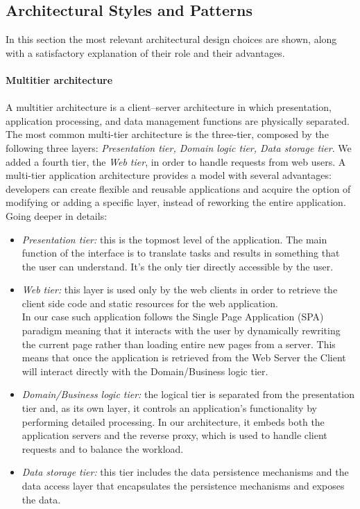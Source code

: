 \subsection{Architectural Styles and Patterns}
In this section the most relevant architectural design choices are shown, along with a satisfactory explanation of their role and their advantages. \\ \\
\noindent
\textbf{Multitier architecture}\\ \\
A multitier architecture is a client–server architecture in which presentation, application processing, and data management functions are physically separated. The most common multi-tier architecture is the three-tier, composed by the following three layers: \textit{Presentation tier, Domain logic tier, Data storage tier}. We added a fourth tier, the \textit{Web tier}, in order to handle requests from web users.
A multi-tier application architecture provides a model with several advantages: developers can create flexible and reusable applications and acquire the option of modifying or adding a specific layer, instead of reworking the entire application. Going deeper in details:
\begin{itemize}
	\item \textit{Presentation tier:} this is the topmost level of the application. The main function of the interface is to translate tasks and results in something that the user can understand. It's the only tier directly accessible by the user.
	\item \textit{Web tier:} this layer is used only by the web clients in order to retrieve the client side code and static resources for the web application. \\
	In our case such application follows the Single Page Application (SPA) paradigm meaning that it interacts with the user by dynamically rewriting the current page rather than loading entire new pages from a server.
	This means that once the application is retrieved from the Web Server the Client will interact directly with the Domain/Business logic tier.
	\item \textit{Domain/Business logic tier:} the logical tier is separated from the presentation tier and, as its own layer, it controls an application’s functionality by performing detailed processing. In our architecture, it embeds both the application servers and the reverse proxy, which is used to handle client requests and to balance the workload.
	\item \textit{Data storage tier:} this tier includes the data persistence mechanisms and the data access layer that encapsulates the persistence mechanisms and exposes the data. 
	
\end{itemize}


